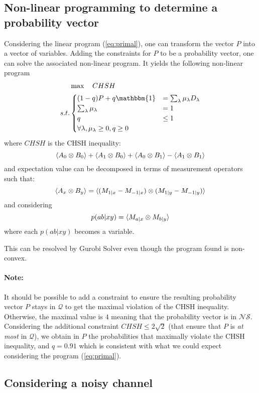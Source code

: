 \documentclass[12pt]{article}
\newcommand{\NS}{\mathcal{NS}}
\newcommand{\Q}{\mathcal{Q}}
\newcommand{\note}{\paragraph{Note:}}
\newenvironment{Figure}
  {\par\medskip\noindent\minipage{\linewidth}}
  {\endminipage\par\medskip}
\begin{document}
\begin{multicols}{2}
\subsection*{Non-linear programming to determine a probability vector}
Considering the linear program (\ref{eq:primal}), one can transform the vector $P$
into a vector of variables. Adding the constraints for $P$ to be a probability
vector, one can solve the associated non-linear program. It yields the following
non-linear program
\begin{equation} \label{eq:primal-nl}
	\begin{aligned}
			  & \max \quad CHSH\\
		s.t.  &
		\begin{cases}
			(1-q) P + q \mathbbm{1}  & = \sum_\lambda \mu_\lambda D_\lambda \\
			\sum_\lambda \mu_\lambda & = 1 \\
			q & \leq 1 \\
			\forall \lambda, \mu_\lambda \geq 0, q \geq 0
		\end{cases}
	\end{aligned}
\end{equation}
where $CHSH$ is the CHSH inequality:
\begin{equation}
	\braket{A_0 \otimes B_0} +
	\braket{A_1 \otimes B_0} +
	\braket{A_0 \otimes B_1} -
	\braket{A_1 \otimes B_1}
\end{equation}
and expectation value can be decomposed in terms of measurement operators such that:
\begin{equation}
	\braket{A_x \otimes B_y} = \braket{(M_{1|x} - M_{-1|x})\otimes(M_{1|y} - M_{-1|y})}
\end{equation}
and considering
\begin{equation}
	p(ab|xy) = \braket{M_{a|x} \otimes M_{b|y}}
\end{equation}
where each $p(ab|xy)$ becomes a variable.

This can be resolved by Gurobi Solver \cite{gurobi} even though the program
found is non-convex.

\note It should be possible to add a constraint to ensure the resulting
probability vector $P$ stays in $\Q$ to get the maximal violation of the CHSH
inequality. Otherwise, the maximal value is $4$ meaning that the probability
vector is in $\NS$. Considering the additional constraint $CHSH \leq 2 \sqrt 2$
(that ensure that $P$ is \textit{at most} in $\Q$), we obtain in $P$ the
probabilities that maximally violate the CHSH inequality, and $q = 0.91$ which
is consistent with what we could expect considering the program
(\ref{eq:primal}).

\subsection*{Considering a noisy channel}

\begin{Figure}

\end{Figure}

\end{multicols}



\end{document}
